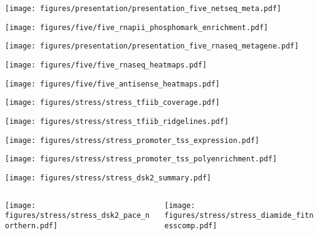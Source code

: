 \documentclass[aspectratio=169]{beamer}
\begin{document}
\begin{frame}
    \centering
    \texttt{[image: figures/presentation/presentation\_five\_netseq\_meta.pdf]}
\end{frame}

\begin{frame}
    \texttt{[image: figures/five/five\_rnapii\_phosphomark\_enrichment.pdf]}
\end{frame}

\begin{frame}
    \centering
    \texttt{[image: figures/presentation/presentation\_five\_rnaseq\_metagene.pdf]}
\end{frame}

\begin{frame}
    \texttt{[image: figures/five/five\_rnaseq\_heatmaps.pdf]}
\end{frame}

\begin{frame}
    \texttt{[image: figures/five/five\_antisense\_heatmaps.pdf]}
\end{frame}

\begin{frame}
    \texttt{[image: figures/stress/stress\_tfiib\_coverage.pdf]}
\end{frame}

\begin{frame}
    \texttt{[image: figures/stress/stress\_tfiib\_ridgelines.pdf]}
\end{frame}

\begin{frame}
    \texttt{[image: figures/stress/stress\_promoter\_tss\_expression.pdf]}
\end{frame}

\begin{frame}
    \texttt{[image: figures/stress/stress\_promoter\_tss\_polyenrichment.pdf]}
\end{frame}

\begin{frame}
    \texttt{[image: figures/stress/stress\_dsk2\_summary.pdf]}
\end{frame}

\begin{frame}
    \begin{columns}
        \begin{column}{0.5\textwidth}
            \texttt{[image: figures/stress/stress\_dsk2\_pace\_northern.pdf]}
        \end{column}
        \begin{column}{0.5\textwidth}
            \texttt{[image: figures/stress/stress\_diamide\_fitnesscomp.pdf]}
        \end{column}
    \end{columns}
\end{frame}
\end{document}
